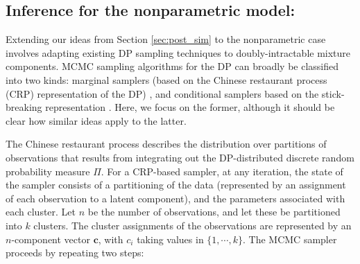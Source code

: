 \subsection{Inference for the nonparametric model:}
Extending our ideas from Section \ref{sec:post_sim} to the nonparametric case involves adapting existing DP sampling techniques to
doubly-intractable mixture components.
MCMC sampling algorithms for the DP can broadly be classified into two kinds: marginal samplers (based on the Chinese restaurant process (CRP) representation %
of the DP) \citep{Nea2000}, and conditional samplers based on the stick-breaking representation \citep{IshJam2001}. Here, we focus on the former, although it should be clear how
similar ideas apply to the latter.

The Chinese restaurant process describes the distribution over partitions of observations that results from integrating out the DP-distributed 
discrete random probability measure $\Pi$.
For a CRP-based sampler, at any iteration, the state of the sampler
consists of a partitioning of the data (represented by an assignment of each observation to a latent component), and the parameters associated with each cluster.
Let $n$ be the number of observations, and let these be partitioned into $k$ clusters.
The cluster assignments of the observations are represented by an $n$-component vector $\mathbf{c}$, with $c_i$ taking values in $\{1,\cdots,k\}$.
The MCMC sampler proceeds by repeating two steps:

